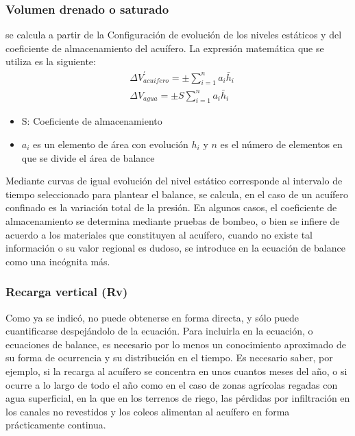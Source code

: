 \subsubsection{Volumen drenado o saturado}
se calcula a partir de la Configuración de evolución de los niveles estáticos y del coeficiente de almacenamiento del acuífero. La expresión matemática que se utiliza es la siguiente:
\begin{align}
    &\Delta V^{\prime}_{acuifero}= \pm \sum_{i = 1}^{n} a_i \bar{h}_i\\
    &\Delta V_{agua}= \pm S \sum_{i= 1}^{n} a_i \bar{h}_i
\end{align}
\begin{notation}
    \begin{itemize}
        \item S: Coeficiente de almacenamiento
        \item $a_i$ es un elemento de área con evolución $h_i$ y $n$ es el número de elementos en que se divide el área de balance
    \end{itemize}
\end{notation}
Mediante curvas de igual evolución del nivel estático corresponde al intervalo de tiempo seleccionado para plantear el balance, se calcula, en el caso de un acuífero confinado es la variación total de la presión. En algunos casos, el coeficiente de almacenamiento se determina mediante pruebas de bombeo, o bien se infiere de acuerdo a los materiales que constituyen al acuífero, cuando no existe tal información o su valor regional es dudoso, se introduce en la ecuación de balance como una incógnita más.

\subsubsection{Recarga vertical (Rv)}
Como ya se indicó, no puede obtenerse en forma directa, y sólo puede cuantificarse despejándolo de la ecuación. Para incluirla en la ecuación, o ecuaciones de balance, es necesario por lo menos un conocimiento aproximado de su forma de ocurrencia y su distribución en el tiempo. Es necesario saber, por ejemplo, si la recarga al acuífero se concentra en unos cuantos meses del año, o si ocurre a lo largo de todo el año como en el caso de zonas agrícolas regadas con agua superficial, en la que en los terrenos de riego, las pérdidas por infiltración en los canales no revestidos y los coleos alimentan al acuífero en forma prácticamente continua.

